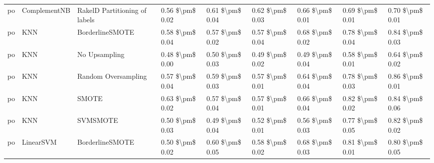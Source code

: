 \begin{tabular}{lllllllll}
      po &                    ComplementNB & RakelD Partitioning of labels &     0.56 \$\textbackslash pm\$ 0.02 &           0.61 \$\textbackslash pm\$ 0.04 &       0.62 \$\textbackslash pm\$ 0.03 &        0.66 \$\textbackslash pm\$ 0.01 &                         0.69 \$\textbackslash pm\$ 0.01 &     0.70 \$\textbackslash pm\$ 0.01 \\
      po &                             KNN &               BorderlineSMOTE &     0.58 \$\textbackslash pm\$ 0.04 &           0.57 \$\textbackslash pm\$ 0.02 &       0.57 \$\textbackslash pm\$ 0.04 &        0.68 \$\textbackslash pm\$ 0.02 &                         0.78 \$\textbackslash pm\$ 0.04 &     0.84 \$\textbackslash pm\$ 0.03 \\
      po &                             KNN &                 No Upsampling &     0.48 \$\textbackslash pm\$ 0.00 &           0.50 \$\textbackslash pm\$ 0.03 &       0.49 \$\textbackslash pm\$ 0.02 &        0.49 \$\textbackslash pm\$ 0.04 &                         0.58 \$\textbackslash pm\$ 0.01 &     0.64 \$\textbackslash pm\$ 0.02 \\
      po &                             KNN &           Random Oversampling &     0.57 \$\textbackslash pm\$ 0.04 &           0.59 \$\textbackslash pm\$ 0.03 &       0.57 \$\textbackslash pm\$ 0.01 &        0.64 \$\textbackslash pm\$ 0.04 &                         0.78 \$\textbackslash pm\$ 0.03 &     0.86 \$\textbackslash pm\$ 0.01 \\
      po &                             KNN &                         SMOTE &     0.63 \$\textbackslash pm\$ 0.02 &           0.57 \$\textbackslash pm\$ 0.04 &       0.57 \$\textbackslash pm\$ 0.01 &        0.66 \$\textbackslash pm\$ 0.04 &                         0.82 \$\textbackslash pm\$ 0.02 &     0.84 \$\textbackslash pm\$ 0.06 \\
      po &                             KNN &                      SVMSMOTE &     0.50 \$\textbackslash pm\$ 0.03 &           0.49 \$\textbackslash pm\$ 0.04 &       0.52 \$\textbackslash pm\$ 0.01 &        0.56 \$\textbackslash pm\$ 0.03 &                         0.77 \$\textbackslash pm\$ 0.05 &     0.82 \$\textbackslash pm\$ 0.02 \\
      po &                       LinearSVM &               BorderlineSMOTE &     0.50 \$\textbackslash pm\$ 0.02 &           0.60 \$\textbackslash pm\$ 0.05 &       0.58 \$\textbackslash pm\$ 0.02 &        0.68 \$\textbackslash pm\$ 0.03 &                         0.81 \$\textbackslash pm\$ 0.01 &     0.80 \$\textbackslash pm\$ 0.05 \\

\end{tabular}
